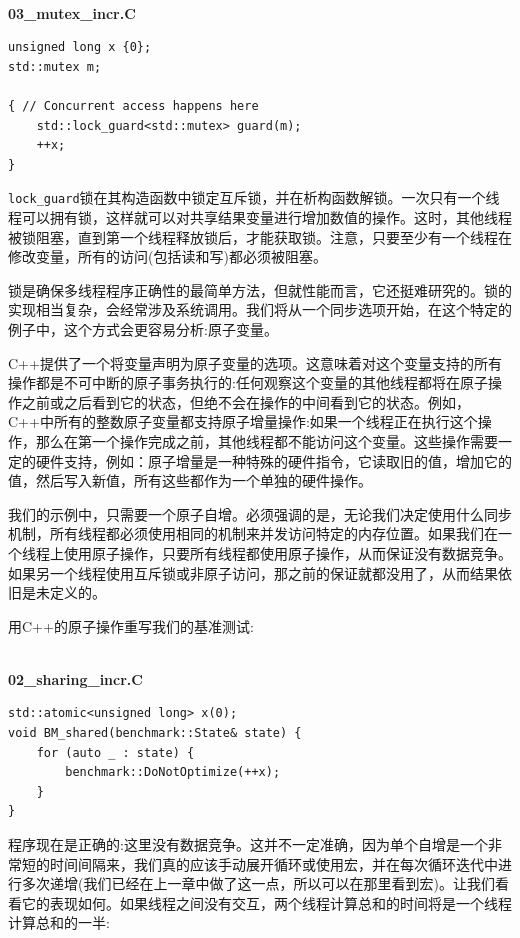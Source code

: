\hspace*{\fill} \\ %
\noindent
\textbf{03\_mutex\_incr.C}
\begin{lstlisting}[style=styleCXX]
unsigned long x {0};
std::mutex m;

{ // Concurrent access happens here
	std::lock_guard<std::mutex> guard(m);
	++x;
}
\end{lstlisting}

\texttt{lock\_guard}锁在其构造函数中锁定互斥锁，并在析构函数解锁。一次只有一个线程可以拥有锁，这样就可以对共享结果变量进行增加数值的操作。这时，其他线程被锁阻塞，直到第一个线程释放锁后，才能获取锁。注意，只要至少有一个线程在修改变量，所有的访问(包括读和写)都必须被阻塞。

锁是确保多线程程序正确性的最简单方法，但就性能而言，它还挺难研究的。锁的实现相当复杂，会经常涉及系统调用。我们将从一个同步选项开始，在这个特定的例子中，这个方式会更容易分析:原子变量。

C++提供了一个将变量声明为原子变量的选项。这意味着对这个变量支持的所有操作都是不可中断的原子事务执行的:任何观察这个变量的其他线程都将在原子操作之前或之后看到它的状态，但绝不会在操作的中间看到它的状态。例如，C++中所有的整数原子变量都支持原子增量操作:如果一个线程正在执行这个操作，那么在第一个操作完成之前，其他线程都不能访问这个变量。这些操作需要一定的硬件支持，例如：原子增量是一种特殊的硬件指令，它读取旧的值，增加它的值，然后写入新值，所有这些都作为一个单独的硬件操作。

我们的示例中，只需要一个原子自增。必须强调的是，无论我们决定使用什么同步机制，所有线程都必须使用相同的机制来并发访问特定的内存位置。如果我们在一个线程上使用原子操作，只要所有线程都使用原子操作，从而保证没有数据竞争。如果另一个线程使用互斥锁或非原子访问，那之前的保证就都没用了，从而结果依旧是未定义的。

用C++的原子操作重写我们的基准测试:

\hspace*{\fill} \\ %
\noindent
\textbf{02\_sharing\_incr.C}
\begin{lstlisting}[style=styleCXX]
std::atomic<unsigned long> x(0);
void BM_shared(benchmark::State& state) {
	for (auto _ : state) {
		benchmark::DoNotOptimize(++x);
	}
}
\end{lstlisting}

程序现在是正确的:这里没有数据竞争。这并不一定准确，因为单个自增是一个非常短的时间间隔来，我们真的应该手动展开循环或使用宏，并在每次循环迭代中进行多次递增(我们已经在上一章中做了这一点，所以可以在那里看到宏)。让我们看看它的表现如何。如果线程之间没有交互，两个线程计算总和的时间将是一个线程计算总和的一半:

